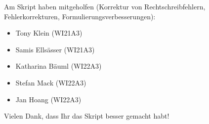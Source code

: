 Am Skript haben mitgeholfen
(Korrektur von Rechtschreibfehlern, Fehlerkorrekturen, Formulierungsverbesserungen):
\begin{itemize}
\item Tony Klein (WI21A3)
\item Samis Ellsässer (WI21A3)
\item Katharina Bäuml (WI22A3)
\item Stefan Mack (WI22A3)
\item Jan Hoang (WI22A3)
\end{itemize}
Vielen Dank, dass Ihr das Skript besser gemacht habt!
